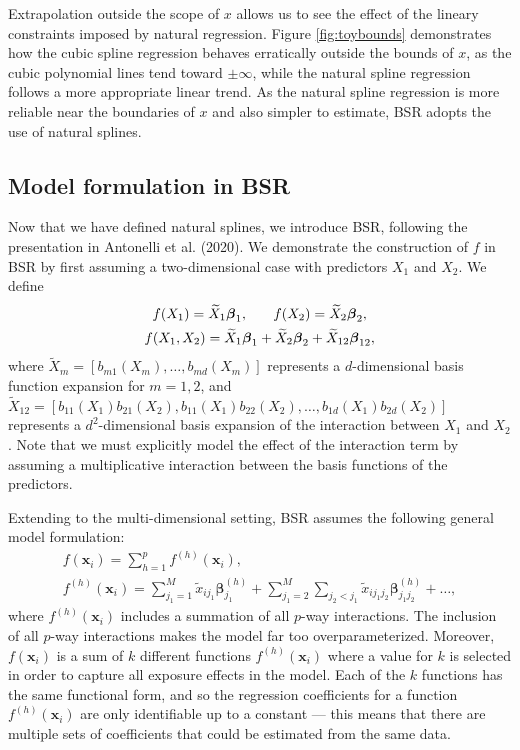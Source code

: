 \documentclass[12pt, twoside]{amherstthesis}
\begin{document}
Extrapolation outside the scope of \(x\) allows us to see the effect of the lineary constraints imposed by natural regression. Figure \ref{fig:toybounds} demonstrates how the cubic spline regression behaves erratically outside the bounds of \(x\), as the cubic polynomial lines tend toward \(\pm\infty\), while the natural spline regression follows a more appropriate linear trend. As the natural spline regression is more reliable near the boundaries of \(x\) and also simpler to estimate, BSR adopts the use of natural splines.

\hypertarget{model-formulation-in-bsr}{%
\subsection{Model formulation in BSR}\label{model-formulation-in-bsr}}

Now that we have defined natural splines, we introduce BSR, following the presentation in Antonelli et al. (2020). We demonstrate the construction of \(f\) in BSR by first assuming a two-dimensional case with predictors \(X_1\) and \(X_2\). We define
\begin{gather*}
f(X_1) = \widetilde{X}_1\boldsymbol{\beta}_1, \hspace{0.25in} f(X_2) = \widetilde{X}_2\boldsymbol{\beta}_2,\\
f(X_1,X_2) = \widetilde{X}_1\boldsymbol{\beta}_1 + \widetilde{X}_2\boldsymbol{\beta}_2 + \widetilde{X}_{12}\boldsymbol{\beta}_{12},
\end{gather*}
\noindent where \(\widetilde{X}_m=[b_{m1}(X_m),\dots,b_{md}(X_m)]\) represents a \(d\)-dimensional basis function expansion for \(m=1,2\), and \(\widetilde{X}_{12}= [b_{11}(X_1)b_{21}(X_2), b_{11}(X_1)b_{22}(X_2), \dots, b_{1d}(X_1)b_{2d}(X_2)]\) represents a \(d^2\)-dimensional basis expansion of the interaction between \(X_1\) and \(X_2\). Note that we must explicitly model the effect of the interaction term by assuming a multiplicative interaction between the basis functions of the predictors.

Extending to the multi-dimensional setting, BSR assumes the following general model formulation:
\begin{gather*}
f(\textbf{x}_i)= \sum_{h=1}^pf^{(h)}(\textbf{x}_i), \\
f^{(h)}(\textbf{x}_i)= \sum_{j_1=1}^M\widetilde{x}_{ij_1}\boldsymbol\beta_{j_1}^{(h)} + 
\sum_{j_1=2}^M\sum_{j_2<j_1}\widetilde{x}_{ij_1j_2}\boldsymbol\beta_{j_1j_2}^{(h)} + \dots,
\end{gather*}
\noindent where \(f^{(h)}(\textbf{x}_i)\) includes a summation of all \(p\)-way interactions. The inclusion of all \(p\)-way interactions makes the model far too overparameterized. Moreover, \(f(\textbf{x}_i)\) is a sum of \(k\) different functions \(f^{(h)}(\textbf{x}_i)\) where a value for \(k\) is selected in order to capture all exposure effects in the model. Each of the \(k\) functions has the same functional form, and so the regression coefficients for a function \(f^{(h)}(\textbf{x}_i)\) are only identifiable up to a constant --- this means that there are multiple sets of coefficients that could be estimated from the same data.
\end{document}
